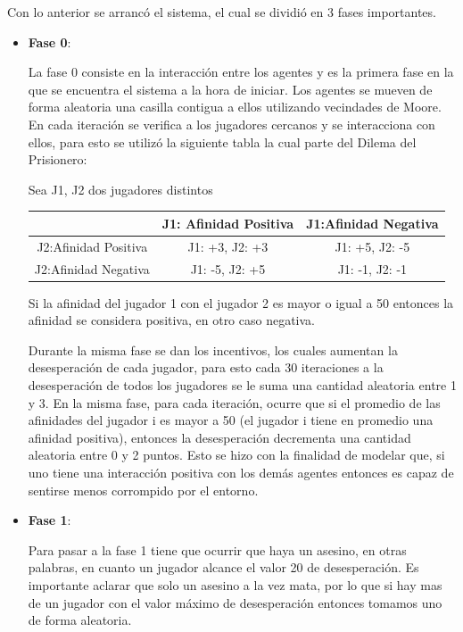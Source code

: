 \documentclass[11pt,letterpaper]{article}
\begin{document}
Con lo anterior se arrancó el sistema, el cual se dividió en 3 fases importantes.

\begin{itemize}
	\item {\large \textbf{Fase 0}}:
	
	La fase 0 consiste en la interacción entre los agentes y es la primera fase en 
	la que se encuentra el sistema a la hora de iniciar. Los agentes se mueven de
	forma aleatoria una casilla contigua a ellos utilizando vecindades de Moore.
	En cada iteración se verifica a los jugadores cercanos y se interacciona con 
	ellos, para esto se utilizó la siguiente tabla la cual parte del Dilema del Prisionero\cite{WDil}:
	
	Sea J1, J2 dos jugadores distintos
	
	\begin{tabular}{|c|c|c|}
		\hline 
		& J1: Afinidad Positiva & J1:Afinidad Negativa \\ 
		\hline 
		J2:Afinidad Positiva & J1: +3, J2: +3 & J1: +5, J2: -5 \\ 
		\hline 
		J2:Afinidad Negativa & J1: -5, J2: +5 & J1: -1, J2: -1 \\ 
		\hline 
	\end{tabular} 

	Si la afinidad del jugador 1 con el jugador 2 es mayor o igual a 50 entonces
	la afinidad se considera positiva, en otro caso negativa.
	
	Durante la misma fase se dan los incentivos, los cuales aumentan la desesperación
	de cada jugador, para esto cada 30 iteraciones a la desesperación de todos
	los jugadores se le suma una cantidad aleatoria entre 1 y 3. En la misma fase,
	para cada iteración, ocurre que si el promedio de las afinidades del jugador i es mayor a 50 (el jugador i tiene en promedio una afinidad positiva), entonces la
	desesperación decrementa una cantidad aleatoria entre 0 y 2 puntos. Esto se hizo con la finalidad de modelar que, si uno tiene una interacción positiva 
	con los demás agentes entonces es capaz de sentirse menos corrompido por el entorno. 
	
	
	\item {\large \textbf{Fase 1}}: 
	
	Para pasar a la fase 1 tiene que ocurrir que haya un asesino, en otras palabras, en cuanto un jugador alcance el valor 20 de desesperación.
	Es importante aclarar que solo un asesino a la vez mata, por lo que si hay mas de un jugador con el valor máximo de desesperación entonces tomamos uno de forma aleatoria.
	

\end{itemize}
\end{document}
